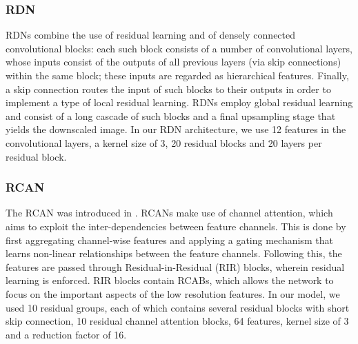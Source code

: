 \subsubsection{RDN}

\acp{RDN} \cite{Zhang2018ResidualDenseSuperResolution} combine the use of residual learning and of densely connected convolutional blocks: each such block consists of a number of convolutional layers, whose inputs consist of the outputs of all previous layers (via skip connections) within the same block; these inputs are regarded as hierarchical features. Finally, a skip connection routes the input of such blocks to their outputs in order to implement a type of local residual learning. \acp{RDN} employ global residual learning and consist of a long cascade of such blocks and a final upsampling stage that yields the downscaled image. In our \ac{RDN} architecture, we use 12 features in the convolutional layers, a kernel size of 3, 20 residual blocks and 20 layers per residual block.




\subsubsection{RCAN}

The \ac{RCAN} was introduced in \cite{Zhang2018RCANSuperResolution}. \acp{RCAN} make use of channel attention, which aims to exploit the inter-dependencies between feature channels. This is done by first aggregating channel-wise features and applying a gating mechanism that learns non-linear relationships between the feature channels. Following this, the features are passed through Residual-in-Residual (RIR) blocks, wherein residual learning is enforced. RIR blocks contain \acp{RCAB}, which allows the network to focus on the important aspects of the low resolution features. In our model, we used 10 residual groups, each of which contains several residual blocks with short skip connection, 10 residual channel attention blocks, 64 features, kernel size of 3 and a reduction factor of 16. 


